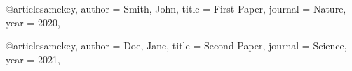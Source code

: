 @article{samekey,
  author = {Smith, John},
  title = {First Paper},
  journal = {Nature},
  year = {2020},
}

@article{samekey,
  author = {Doe, Jane},
  title = {Second Paper},
  journal = {Science},
  year = {2021},
}
